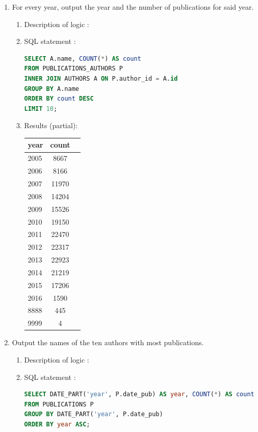 \documentclass[doubleside, titlepage]{article}
\begin{document}
\begin{enumerate}
\item For every year, output the year and the number of publications for said year.
	\begin{enumerate}
	\item Description of logic :\\
	\item SQL statement :
		\begin{lstlisting}[language=SQL,showspaces=false,basicstyle=\ttfamily,numberstyle=\tiny,commentstyle=\color{gray}]
SELECT A.name, COUNT(*) AS count
FROM PUBLICATIONS_AUTHORS P
INNER JOIN AUTHORS A ON P.author_id = A.id
GROUP BY A.name
ORDER BY count DESC
LIMIT 10;
		\end{lstlisting}

	\item Results (partial):\\
	
	\begin{tabular}{|l|c|r|}
  \hline
  year & count \\
  \hline
2005 & 	8667\\
2006 & 	8166\\
2007 & 	11970\\
2008 & 	14204\\
2009 & 	15526\\
2010 & 	19150\\
2011 & 	22470\\
2012 & 	22317\\
2013 & 	22923\\
2014 & 	21219\\
2015 & 	17206\\
2016 & 	1590\\
8888 & 	445\\
9999 & 	4\\
\hline
\end{tabular}

	\end{enumerate}
\item Output the names of the ten authors with most publications.
	
		\begin{enumerate}
	\item Description of logic :\\
	\item SQL statement :
		\begin{lstlisting}[language=SQL,showspaces=false,basicstyle=\ttfamily,numberstyle=\tiny,commentstyle=\color{gray}]
SELECT DATE_PART('year', P.date_pub) AS year, COUNT(*) AS count
FROM PUBLICATIONS P
GROUP BY DATE_PART('year', P.date_pub)
ORDER BY year ASC;
		\end{lstlisting}


\end{enumerate}
\end{enumerate}
\end{document}
